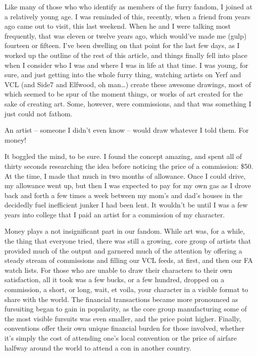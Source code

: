 
Like many of those who who identify as members of the furry fandom, I joined at a relatively young age.  I was reminded of this, recently, when a friend from years ago came out to visit, this last weekend.  When he and I were talking most frequently, that was eleven or twelve years ago, which would've made me (gulp) fourteen or fifteen.  I've been dwelling on that point for the last few days, as I worked up the outline of the rest of this article, and things finally fell into place when I consider who I was and where I was in life at that time.  I was young, for sure, and just getting into the whole furry thing, watching artists on Yerf and VCL (and Side7 and Elfwood, oh man\ldots ) create these awesome drawings, most of which seemed to be spur of the moment things, or works of art created for the sake of creating art.  Some, however, were commissions, and that was something I just could not fathom.

An artist -- someone I didn't even know -- would draw whatever I told them. For money!

It boggled the mind, to be sure.  I found the concept amazing, and spent all of thirty seconds researching the idea before noticing the price of a commission: \$50.  At the time, I made that much in two months of allowance.  Once I could drive, my allowance went up, but then I was expected to pay for my own gas as I drove back and forth a few times a week between my mom's and dad's houses in the decidedly fuel inefficient junker I had been lent.  It wouldn't be until I was a few years into college that I paid an artist for a commission of my character.

Money plays a not insignificant part in our fandom.  While art was, for a while, the thing that everyone tried, there was still a growing, core group of artists that provided much of the output and garnered much of the attention by offering a steady stream of commissions and filling our VCL feeds, at first, and then our FA watch lists.  For those who are unable to draw their characters to their own satisfaction, all it took was a few bucks, or a few hundred, dropped on a commission, a short, or long, wait, et voila, your character in a visible format to share with the world.  The financial transactions became more pronounced as fursuiting began to gain in popularity, as the core group manufacturing some of the most visible fursuits was even smaller, and the price point higher.  Finally, conventions offer their own unique financial burden for those involved, whether it's simply the cost of attending one's local convention or the price of airfare halfway around the world to attend a con in another country.

